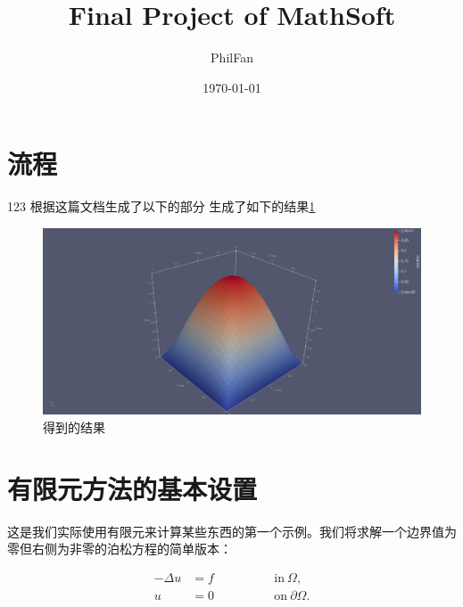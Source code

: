 \documentclass[12pt, a4paper]{article}
\title{Final Project of MathSoft}
\author{PhilFan}
\date{\today}
\numberwithin{equation}{section} %
\begin{document}
\maketitle
\setcounter{page}{0}
\maketitle
\thispagestyle{empty}


\newpage
{}
\setcounter{page}{1}
\tableofcontents

\newpage
\setcounter{page}{1}
\pagestyle{sectionheader} %


\section{流程}
123
\cite{refa}
根据这篇文档生成了以下的部分
生成了如下的结果\ref{pic}


\begin{figure}[H]%
	\centering
	\begin{minipage}{0.83\textwidth}%
		\centering
		\includegraphics[width=1.0%
		\textwidth]{proj.png}%
		\caption{\fontsize{10pt}{15pt}\selectfont 得到的结果}%
		\label{pic}
	\end{minipage}
\end{figure}


\newpage
\section{有限元方法的基本设置}
这是我们实际使用有限元来计算某些东西的第一个示例。我们将求解一个边界值为零但右侧为非零的泊松方程的简单版本：

\begin{align*} 
	-\Delta u &= f 	\qquad 	\qquad & \text{in}\ \Omega,\\ 
	u &= 0 		\qquad	\qquad & \text{on}\ \partial\Omega. 
\end{align*}
\end{document}
